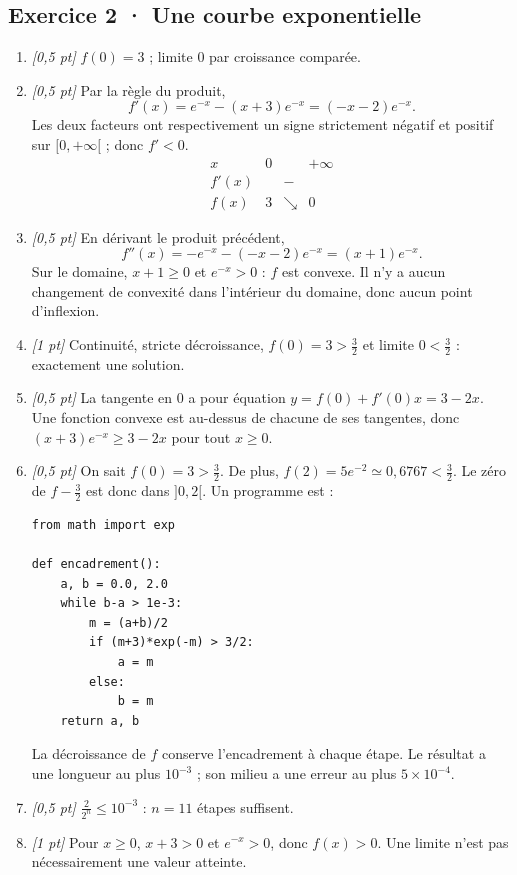 \subsection*{Exercice 2 · Une courbe exponentielle}\begin{enumerate}

\item \textit{[0,5 pt]} $f(0)=3$ ; limite $0$ par croissance comparée.

\item \textit{[0,5 pt]} Par la règle du produit,
\[f'(x)=e^{-x}-(x+3)e^{-x}=(-x-2)e^{-x}.\]
Les deux facteurs ont respectivement un signe strictement négatif et positif sur $[0,+\infty[$ ; donc $f'<0$.
\[\begin{array}{c|ccc}x&0&&+\infty\\\hline f'(x)&&-&\\\hline f(x)&3&\searrow&0\end{array}\]

\item \textit{[0,5 pt]} En dérivant le produit précédent,
\[f''(x)=-e^{-x}-(-x-2)e^{-x}=(x+1)e^{-x}.\]
Sur le domaine, $x+1\ge0$ et $e^{-x}>0$ : $f$ est convexe. Il n'y a aucun changement de convexité dans l'intérieur du domaine, donc aucun point d'inflexion.

\item \textit{[1 pt]} Continuité, stricte décroissance, $f(0)=3>\frac{3}{2}$ et limite $0<\frac{3}{2}$ : exactement une solution.

\item \textit{[0,5 pt]} La tangente en $0$ a pour équation $y=f(0)+f'(0)x=3-2x$. Une fonction convexe est au-dessus de chacune de ses tangentes, donc $(x+3)e^{-x}\ge 3-2x$ pour tout $x\ge0$.


\item \textit{[0,5 pt]} On sait $f(0)=3>\frac{3}{2}$. De plus, $f(2)=5e^{-2}\simeq0{,}6767<\frac{3}{2}$. Le zéro de $f-\frac{3}{2}$ est donc dans $]0,2[$. Un programme est :
\begin{lstlisting}
from math import exp

def encadrement():
    a, b = 0.0, 2.0
    while b-a > 1e-3:
        m = (a+b)/2
        if (m+3)*exp(-m) > 3/2:
            a = m
        else:
            b = m
    return a, b
\end{lstlisting}
La décroissance de $f$ conserve l'encadrement à chaque étape. Le résultat a une longueur au plus $10^{-3}$ ; son milieu a une erreur au plus $5\times10^{-4}$.

\item \textit{[0,5 pt]} $\frac{2}{2^n}\le10^{-3}$ : $n=11$ étapes suffisent.

\item \textit{[1 pt]} Pour $x\ge0$, $x+3>0$ et $e^{-x}>0$, donc $f(x)>0$. Une limite n'est pas nécessairement une valeur atteinte.

\end{enumerate}

